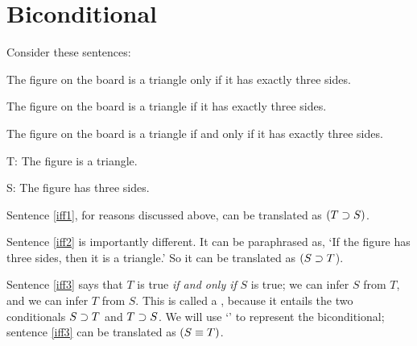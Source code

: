 
%
%
%

\section{Biconditional}
Consider these sentences:
\begin{earg}
\item[\ex{iff1}] The figure on the board is a triangle only if it has exactly three sides.
\item[\ex{iff2}] The figure on the board is a triangle if it has exactly three sides.
\item[\ex{iff3}] The figure on the board is a triangle if and only if it has exactly three sides.
\end{earg}

\begin{ekey}
\item[T:] The figure is a triangle.
\item[S:] The figure has three sides.
\end{ekey}

Sentence \ref{iff1}, for reasons discussed above, can be translated as $(T\supset S)$.

Sentence \ref{iff2} is importantly different. It can be paraphrased as, `If the figure has three sides, then it is a triangle.' So it can be translated as $(S\supset T$).

Sentence \ref{iff3} says that $T$ is true \emph{if and only if} $S$ is true; we can infer $S$ from $T$, and we can infer $T$ from $S$. This is called a , because it entails the two conditionals $S\supset T$ and $T \supset S$. We will use `\eiff' to represent the biconditional; sentence \ref{iff3} can be translated as $(S \equiv T)$.

